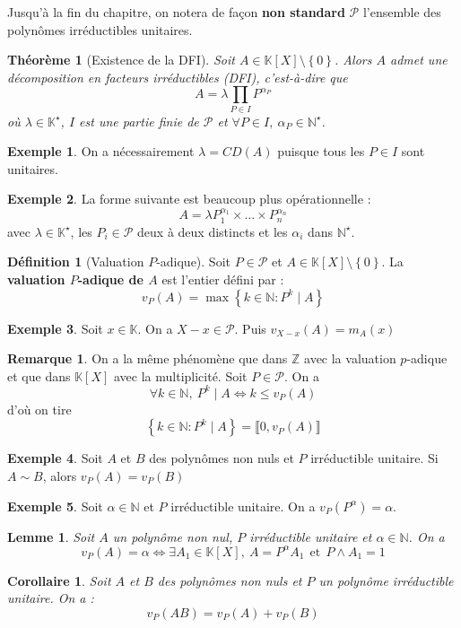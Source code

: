 \documentclass[french]{book}
\newcommand{\N}{\mathbb{N}}
\newcommand{\Z}{\mathbb{Z}}
\newcommand{\K}{\mathbb{K}}
\newcommand{\st}{^\star}
\theoremstyle{plain}
\newtheorem{thm}{Théorème}[chapter]
\newtheorem{lem}{Lemme}[chapter]
\newtheorem{cor}{Corollaire}[chapter]
\theoremstyle{definition}
\newtheorem{dfn}{Définition}[chapter]
\newtheorem{exa}{Exemple}[chapter]
\newtheorem{rmq}{Remarque}[chapter]
\theoremstyle{remark}
\begin{document}
Jusqu'à la fin du chapitre, on notera de façon \textbf{non standard} $\mathcal{P}$ l'ensemble des polynômes irréductibles unitaires.
\begin{thm}[Existence de la DFI]
	Soit $A\in\K[X]\setminus\left\{0\right\}$. Alors $A$ admet une décomposition en facteurs irréductibles (DFI), c'est-à-dire que $$A=\lambda \prod_{P\in I}P^{\alpha_P}$$ où $\lambda\in\K\st$, $I$ est une partie finie de $\mathcal{P}$ et $\forall P\in I,\ \alpha_P\in\N\st$.
\end{thm}
\begin{exa}
	On a nécessairement $\lambda=CD(A)$ puisque tous les $P\in I$ sont unitaires.
\end{exa}
\begin{exa}
	La forme suivante est beaucoup plus opérationnelle : $$A=\lambda P_1^{\alpha_1}\times\ldots\times P_n^{\alpha_n}$$ avec $\lambda\in\K\st$, les $P_i\in\mathcal{P}$ deux à deux distincts et les $\alpha_i$ dans $\N\st$.
\end{exa}
\begin{dfn}[Valuation $P$-adique]
	Soit $P\in\mathcal{P}$ et $A\in\K[X]\setminus\left\{0\right\}$. La \textbf{valuation $P$-adique de $A$} est l'entier défini par : $$v_P(A)=\max\left\{k\in\N : P^k\mid A\right\}$$
\end{dfn}
\begin{exa}
	Soit $x\in\K$. On a $X-x\in\mathcal{P}$. Puis $v_{X-x}(A)=m_A(x)$
\end{exa}
\begin{rmq}
	On a la même phénomène que dans $\Z$ avec la valuation $p$-adique et que dans $\K[X]$ avec la multiplicité. Soit $P\in\mathcal{P}$. On a $$\forall k\in\N,\ P^k \mid A \Longleftrightarrow k\leqslant v_P(A)$$ d'où on tire $$\left\{k\in\N : P^k\mid A\right\}=\llbracket0,v_P(A)\rrbracket$$
\end{rmq}
\begin{exa}
	Soit $A$ et $B$ des polynômes non nuls et $P$ irréductible unitaire. Si $A\sim B$, alors $v_P(A)=v_P(B)$
\end{exa}
\begin{exa}
	Soit $\alpha\in\N$ et $P$ irréductible unitaire. On a $v_P(P^\alpha)=\alpha$.
\end{exa}
\begin{lem}
	Soit $A$ un polynôme non nul, $P$ irréductible unitaire et $\alpha\in\N$. On a $$v_P(A)=\alpha \Longleftrightarrow\exists A_1\in\K[X],\ A=P^\alpha A_1 \ \ \text{et} \ \ P\wedge A_1=1$$
\end{lem}
\begin{cor}
	Soit $A$ et $B$ des polynômes non nuls et $P$ un polynôme irréductible unitaire. On a : $$v_P(AB)=v_P(A)+v_P(B)$$
\end{cor}
\end{document}
